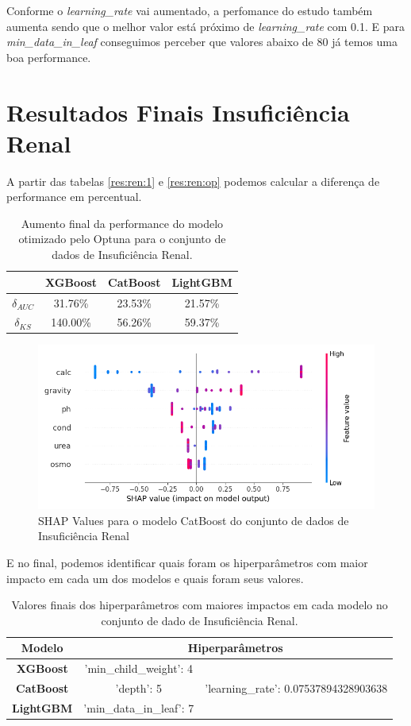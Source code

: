 Conforme o \textit{learning\_rate} vai aumentado, a perfomance do estudo também aumenta sendo que o melhor valor está próximo de \textit{learning\_rate} com 0.1. E para \textit{min\_data\_in\_leaf} conseguimos perceber que valores abaixo de 80 já temos uma boa performance.
\section{Resultados Finais Insuficiência Renal}
A partir das tabelas \ref{res:ren:1} e \ref{res:ren:op} podemos calcular a diferença de performance em percentual.

\begin{table}[H]
\centering
\begin{tabular}{|c|c|c|c|}
\hline
	& \textbf{XGBoost} &\textbf{CatBoost} & \textbf{LightGBM} \\
\hline
$\delta_{AUC}$	& 31.76\%&	23.53\%	   &     21.57\% \\
\hline
$\delta_{KS}$	& 140.00\%     	&  56.26\% &	59.37\%\\
\hline
\end{tabular}
\caption{Aumento final da performance do modelo otimizado pelo Optuna para o conjunto de dados de Insuficiência Renal.}
\end{table}

\begin{figure}[H]
 \caption{SHAP Values para o modelo CatBoost do conjunto de dados de Insuficiência Renal}
 \label{shap:fin:ren}
 \centering
 \includegraphics[scale=0.5]{images/shap_lgbm_kidney.png}
\end{figure}
E no final, podemos identificar quais foram os hiperparâmetros com maior impacto em cada um dos modelos e quais foram seus valores.
\begin{table}[H]
\centering
\begin{tabular}{|c|c|c|}
\hline
\textbf{Modelo} & \multicolumn{2}{c|}{\textbf{Hiperparâmetros}} \\
\hline
\textbf{XGBoost} & 'min\_child\_weight': 4 & \\
\hline
\textbf{CatBoost} &'depth': 5 & 'learning\_rate': 0.07537894328903638 \\
\hline
\textbf{LightGBM} & 'min\_data\_in\_leaf': 7 &  \\
\hline
\end{tabular}
\caption{Valores finais dos hiperparâmetros com maiores impactos em cada modelo no conjunto de dado de Insuficiência Renal.}
\end{table}

